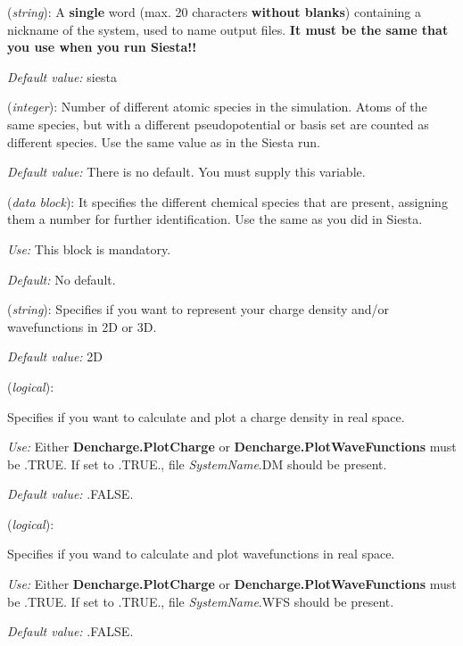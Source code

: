 \begin{description}
\itemsep 10pt
\parsep 0pt

\item[{\bf SystemLabel}] ({\it string}): 
A {\bf single} word (max. 20 characters {\bf without blanks})
containing a nickname of the system, used to name output files. 
{\bf It must be the same that you use when you run {\sc Siesta}!!}

{\it Default value:} siesta

\item[{\bf NumberOfSpecies}] ({\it integer}):
Number of different atomic species in the simulation.
Atoms of the same species, but with a different
pseudopotential or basis set are counted as different species.
Use the same value as in the {\sc Siesta} run.

{\it Default value:} There is no default. You must supply this variable.


\item[{\bf ChemicalSpeciesLabel}] ({\it data block}):
It specifies the different chemical species that are present,
assigning them a number for further identification.
Use the same as you did in {\sc Siesta}.

{\it Use:} This block is mandatory.

{\it Default:} No default.

\item[{\bf Denchar.TypeOfRun}] ({\it string}): 
Specifies if you want to represent your charge density
and/or wavefunctions in 2D or 3D.

{\it Default value:} 2D

\item[{\bf Denchar.PlotCharge}] ({\it logical}): 

Specifies if you want to calculate and plot a charge density
in real space.

{\it Use:} Either {\bf Dencharge.PlotCharge} or
{\bf Dencharge.PlotWaveFunctions} must be .TRUE.
If set to .TRUE., file {\it SystemName}.DM should
be present.

{\it Default value:} .FALSE.

\item[{\bf Denchar.PlotWaveFunctions}] ({\it logical}): 

Specifies if you wand to calculate and plot wavefunctions
in real space.

{\it Use:} Either {\bf Dencharge.PlotCharge} or
{\bf Dencharge.PlotWaveFunctions} must be .TRUE.
If set to .TRUE., file {\it SystemName}.WFS should
be present.

{\it Default value:} .FALSE.
\end{description}



